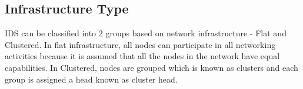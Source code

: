 \subsection{Infrastructure Type}
IDS can be classified into 2 groups based on network infrastructure - Flat and Clustered. In flat infrastructure, all nodes can participate in all networking activities because it is assumed that all the nodes in the network have equal capabilities. In Clustered, nodes are grouped which is known as clusters and each group is assigned a head known as cluster head.



